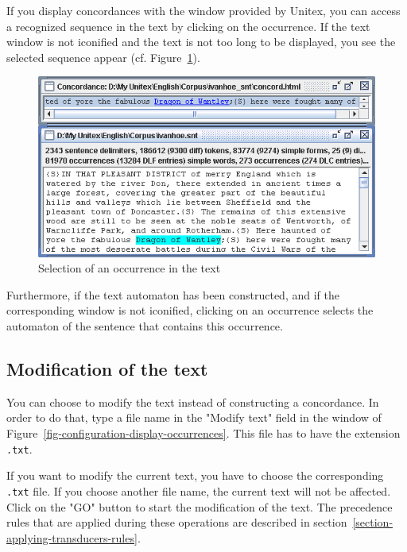 \bigskip
\noindent If you display concordances with the window provided by Unitex,
you can access a recognized sequence in the text by clicking on the occurrence. If
the text window is not iconified and the text is not too long to be displayed,
you see the selected sequence appear (cf.
Figure~\ref{fig-back-to-text}).

\begin{figure}[h]
\begin{center}
\includegraphics[width=13.5cm]{resources/img/fig6-32.png}
\caption{Selection of an occurrence in the text\label{fig-back-to-text}}
\end{center}
\end{figure}

\noindent Furthermore, if the text automaton has been constructed, and if the
corresponding window is not iconified, clicking on an occurrence selects the automaton of the
sentence that contains this occurrence.

\subsection{Modification of the text}
\label{section-modifying-text}
You can choose to modify the text instead of constructing a concordance. In order
to do that, type a file name in the "Modify text" field in the window of
Figure~\ref{fig-configuration-display-occurrences}. This file has to have the
extension \verb+.txt+.

\bigskip
\noindent If you want to modify the current text, you have to choose the
corresponding \verb+.txt+ file. If you choose another file name, the current text will not be
affected. Click on the  "GO" button to start the modification of the text. The
precedence rules that are applied during these operations are described in
section~\ref{section-applying-transducers-rules}.

